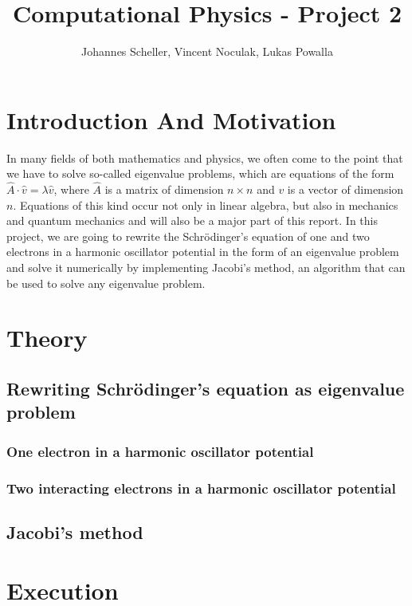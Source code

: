 \documentclass[10pt,a4paper]{article}
\author{Johannes Scheller, Vincent Noculak, Lukas Powalla}
\title{Computational Physics - Project 2}
\begin{document}
\maketitle
\newpage
\tableofcontents
\newpage
\section{Introduction And Motivation}
In many fields of both mathematics and physics, we often come to the point that we have to solve so-called eigenvalue problems, which are equations of the form $\hat{A}\cdot\hat{v}=\lambda\hat{v}$, where $\hat{A}$ is a matrix of dimension $n\times n$ and $v$ is a vector of dimension $n$. Equations of this kind occur not only in linear algebra, but also in mechanics and quantum mechanics and will also be a major part of this report. In this project, we are going to rewrite the Schrödinger's equation of one and two electrons in a harmonic oscillator potential in the form of an eigenvalue problem and solve it numerically by implementing Jacobi's method, an algorithm that can be used to solve any eigenvalue problem.

\section{Theory}
\subsection{Rewriting Schrödinger's equation as eigenvalue problem}
\subsubsection{One electron in a harmonic oscillator potential}
\subsubsection{Two interacting electrons in a harmonic oscillator potential}
\subsection{Jacobi's method}
\section{Execution}
\end{document}
